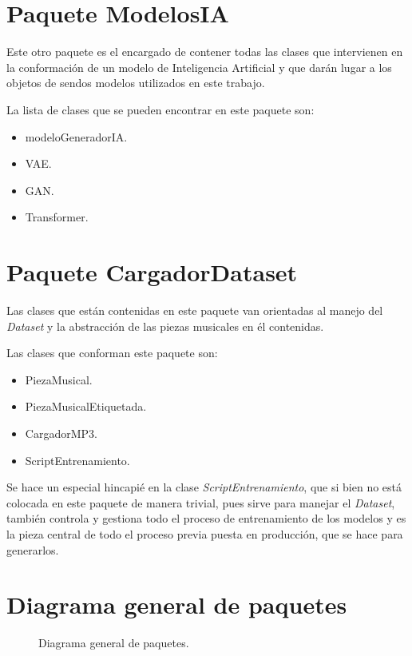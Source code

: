 \section{Paquete ModelosIA}

Este otro paquete es el encargado de contener todas las clases que intervienen en la conformación de un modelo de Inteligencia Artificial y que darán lugar a los objetos de sendos modelos utilizados en este trabajo.

La lista de clases que se pueden encontrar en este paquete son:
\begin{itemize}
  \item modeloGeneradorIA.
  \item VAE.
  \item GAN.
  \item Transformer.
\end{itemize}


\section{Paquete CargadorDataset}

Las clases que están contenidas en este paquete van orientadas al manejo del \emph{Dataset} y la abstracción de las piezas musicales en él contenidas.

Las clases que conforman este paquete son:
\begin{itemize}
  \item PiezaMusical.
  \item PiezaMusicalEtiquetada.
  \item CargadorMP3.
  \item ScriptEntrenamiento.
\end{itemize}

Se hace un especial hincapié en la clase \emph{ScriptEntrenamiento}, que si bien no está colocada en este paquete de manera trivial, pues sirve para manejar el \emph{Dataset}, también controla y gestiona todo el proceso de entrenamiento de los modelos y es la pieza central de todo el proceso previa puesta en producción, que se hace para generarlos.


\section{Diagrama general de paquetes}

\begin{figure}[H]
  \centering
  
  \caption{Diagrama general de paquetes.}
\end{figure}
